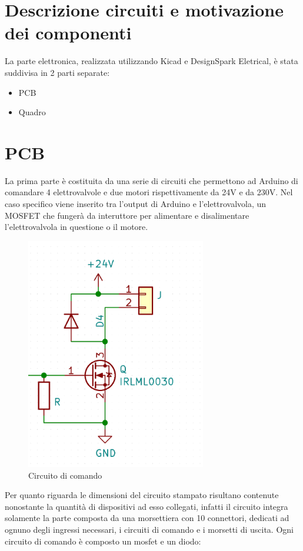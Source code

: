 \documentclass{report}
\begin{document}
\section{Descrizione circuiti e motivazione dei componenti}
La parte elettronica, realizzata utilizzando Kicad e DesignSpark Eletrical, è stata suddivisa in 2 parti separate:
\begin{itemize}
\item PCB
\item Quadro
\end{itemize}
\section{PCB}
La prima parte è costituita da una serie di circuiti che permettono ad Arduino di comandare 4 elettrovalvole e due motori rispettivamente da 24V e da 230V. Nel caso specifico viene inserito tra l'output di Arduino e l'elettrovalvola, un MOSFET che fungerà da interuttore per alimentare e disalimentare l'elettrovalvola in questione o il motore.
\begin{figure}[H]
  \centering
  \includegraphics[width=0.7\textwidth]{src/img/circuito_comando.png}
  \caption{Circuito di comando}
  \label{fig:circuito}
\end{figure}
Per quanto riguarda le dimensioni del circuito stampato risultano contenute nonostante la quantità di dispositivi ad esso collegati, infatti il circuito integra solamente la parte composta da una morsettiera con 10 connettori, dedicati ad ognuno degli ingressi necessari, i circuiti di comando e i morsetti di uscita. Ogni circuito di comando è composto un mosfet e un diodo: 
\end{document}
